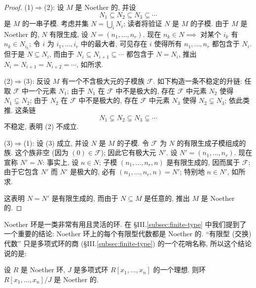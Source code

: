 \begin{proof}
(1)$\Rightarrow$(2): 设 $M$ 是 Noether 的, 并设
\[
N_1 \subseteq N_2 \subseteq N_3 \subseteq \cdots
\]
是 $M$ 的一串子模. 考虑并集 $N = \bigcup_i N_i$; 读者将验证 $N$ 是 $M$ 的子模. 由于 $M$ 是 Noether 的, $N$ 有限生成, 设 $N = (n_1,\dots,n_r)$. 现在 $n_k \in N \implies$ 对某个 $i_k$ 有 $n_k \in N_{i_k}$; 令 $i$ 为 $i_1,\dots,i_r$ 中的最大者, 可见存在 $i$ 使得所有 $n_1,\dots,n_r$ 都包含于 $N_i$. 但于是 $N \subseteq N_i$, 而由于 $N_i \subseteq N_{i+1} \subseteq \cdots$ 都包含于 $N = N_i$, 推出 $N_i = N_{i+1} = N_{i+2} = \cdots$, 如所求.

(2)$\Rightarrow$(3): 反设 $M$ 有一个不含极大元的子模族 $\mathcal{F}$. 如下构造一条不稳定的升链: 任取 $\mathcal{F}$ 中一个元素 $N_1$; 由于 $N_1$ 在 $\mathcal{F}$ 中不是极大的, 存在 $\mathcal{F}$ 中元素 $N_2$ 使得 $N_1 \subsetneq N_2$; 由于 $N_2$ 在 $\mathcal{F}$ 中不是极大的, 存在 $\mathcal{F}$ 中元素 $N_3$ 使得 $N_2 \subsetneq N_3$; 依此类推. 这条链
\[
N_1 \subsetneq N_2 \subsetneq N_3 \subsetneq \cdots
\]
不稳定, 表明 (2) 不成立.

(3)$\Rightarrow$(1): 设 (3) 成立, 并设 $N$ 是 $M$ 的子模. 令 $\mathcal{F}$ 为 $N$ 的有限生成子模组成的族. 这个族非空 (因为 $(0)\in\mathcal{F}$); 因此它有极大元 $N'$. 设 $N' = (n_1,\dots,n_r)$. 现在宣称 $N' = N$: 事实上, 设 $n\in N$; 子模 $(n_1,\dots,n_r,n)$ 是有限生成的, 因而属于 $\mathcal{F}$; 由于它包含 $N'$ 而 $N'$ 是极大的, 必有 $(n_1,\dots,n_r,n) = N'$; 特别地 $n\in N'$, 如所求.

这表明 $N = N'$ 是有限生成的, 而由于 $N\subseteq M$ 是任意的, 推出 $M$ 是 Noether 的.
\end{proof}

Noether 环是一类非常有用且灵活的环. 在 §III.\ref{subsec:finite-type} 中我们提到了一个重要的结论: Noether 环上的每个有限型代数都是 Noether 的. ``有限型 (交换) 代数'' 只是多项式环的商 (§III.\ref{subsec:finite-type}) 的一个花哨名称, 所以这个结论说的是:

\begin{theorem}\label{thm:hilbert-basis}
设 $R$ 是 Noether 环, $J$ 是多项式环 $R[x_1,\dots,x_n]$ 的一个理想. 则环 $R[x_1,\dots,x_n]/J$ 是 Noether 的.
\end{theorem}

